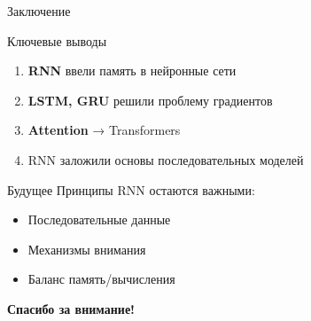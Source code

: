 \documentclass[aspectratio=169, 10pt]{beamer}
\begin{document}
\begin{frame}{Заключение}
  \begin{block}{Ключевые выводы}
    \scriptsize
    \begin{enumerate}
      \item \textbf{RNN} ввели память в нейронные сети
      
      \item \textbf{LSTM, GRU} решили проблему градиентов
      
      \item \textbf{Attention} → Transformers
      
      \item RNN заложили основы последовательных моделей
    \end{enumerate}
  \end{block}
  
  \vspace{0.2cm}
  
  \begin{exampleblock}{Будущее}
    \scriptsize
    Принципы RNN остаются важными:
    \begin{itemize}
      \item Последовательные данные
      \item Механизмы внимания
      \item Баланс память/вычисления
    \end{itemize}
  \end{exampleblock}
  
  \centering
  \vspace{0.2cm}
  {\small \textbf{Спасибо за внимание!}}
\end{frame}
\end{document}
